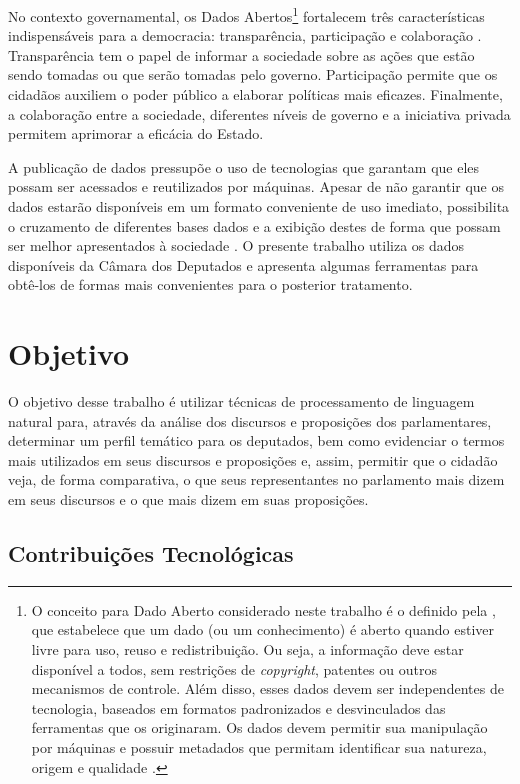 No contexto governamental, os Dados Abertos\footnote{O conceito para Dado Aberto considerado neste trabalho é o definido pela , que estabelece que um dado (ou um conhecimento) é aberto quando estiver livre para uso, reuso e redistribuição. Ou seja, a informação deve estar disponível a todos, sem restrições de \textit{copyright}, patentes ou outros mecanismos de controle. Além disso, esses dados devem ser independentes de tecnologia, baseados em formatos padronizados e desvinculados das ferramentas que os originaram. Os dados devem permitir sua manipulação por máquinas e possuir metadados que permitam identificar sua natureza, origem e qualidade \cite{diniz2010}.} fortalecem três características indispensáveis para a democracia: transparência, participação e colaboração \cite{consegi2011}. Transparência tem o papel de informar a sociedade sobre as ações que estão sendo tomadas ou que serão tomadas pelo governo. Participação permite que os cidadãos auxiliem o poder público a elaborar políticas mais eficazes. Finalmente, a colaboração entre a sociedade, diferentes níveis de governo e a iniciativa privada permitem aprimorar a eficácia do Estado.

A publicação de dados pressupõe o uso de tecnologias que garantam que eles possam ser acessados e reutilizados por máquinas. Apesar de não garantir que os dados estarão disponíveis em um formato conveniente de uso imediato, possibilita o cruzamento de diferentes bases dados e a exibição destes de forma que possam ser melhor apresentados à sociedade \cite{diniz2010}. O presente trabalho utiliza os dados disponíveis da Câmara dos Deputados e apresenta algumas ferramentas para obtê-los de formas mais convenientes para o posterior tratamento.

\section{Objetivo}
\label{sec:objetivo}

O objetivo desse trabalho é utilizar técnicas de processamento de linguagem natural para, através da análise dos discursos e proposições dos parlamentares, determinar um perfil temático para os deputados, bem como evidenciar o termos mais utilizados em seus discursos e proposições e, assim, permitir que o cidadão veja, de forma comparativa, o que seus representantes no parlamento mais dizem em seus discursos e o que mais dizem em suas proposições.

\subsection{Contribuições Tecnológicas}
\label{sub:contribuicoes_tecnologicas}

